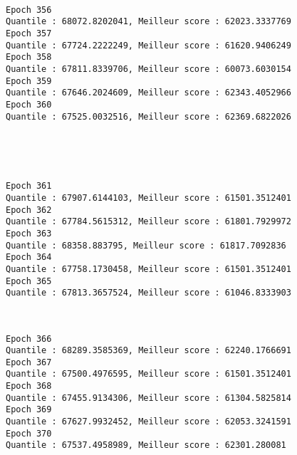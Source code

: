 \documentclass[11pt]{article}
\begin{document}
    \begin{center}
    \end{center}
    { \hspace*{\fill} \\}
    
    \begin{Verbatim}[commandchars=\\\{\}]
Epoch 356
Quantile : 68072.8202041, Meilleur score : 62023.3337769
Epoch 357
Quantile : 67724.2222249, Meilleur score : 61620.9406249
Epoch 358
Quantile : 67811.8339706, Meilleur score : 60073.6030154
Epoch 359
Quantile : 67646.2024609, Meilleur score : 62343.4052966
Epoch 360
Quantile : 67525.0032516, Meilleur score : 62369.6822026

    \end{Verbatim}

    \begin{center}
    \end{center}
    { \hspace*{\fill} \\}
    
    \begin{center}
    \end{center}
    { \hspace*{\fill} \\}
    
    \begin{Verbatim}[commandchars=\\\{\}]
Epoch 361
Quantile : 67907.6144103, Meilleur score : 61501.3512401
Epoch 362
Quantile : 67784.5615312, Meilleur score : 61801.7929972
Epoch 363
Quantile : 68358.883795, Meilleur score : 61817.7092836
Epoch 364
Quantile : 67758.1730458, Meilleur score : 61501.3512401
Epoch 365
Quantile : 67813.3657524, Meilleur score : 61046.8333903

    \end{Verbatim}

    \begin{center}
    \end{center}
    { \hspace*{\fill} \\}
    
    \begin{Verbatim}[commandchars=\\\{\}]
Epoch 366
Quantile : 68289.3585369, Meilleur score : 62240.1766691
Epoch 367
Quantile : 67500.4976595, Meilleur score : 61501.3512401
Epoch 368
Quantile : 67455.9134306, Meilleur score : 61304.5825814
Epoch 369
Quantile : 67627.9932452, Meilleur score : 62053.3241591
Epoch 370
Quantile : 67537.4958989, Meilleur score : 62301.280081

    \end{Verbatim}
\end{document}
